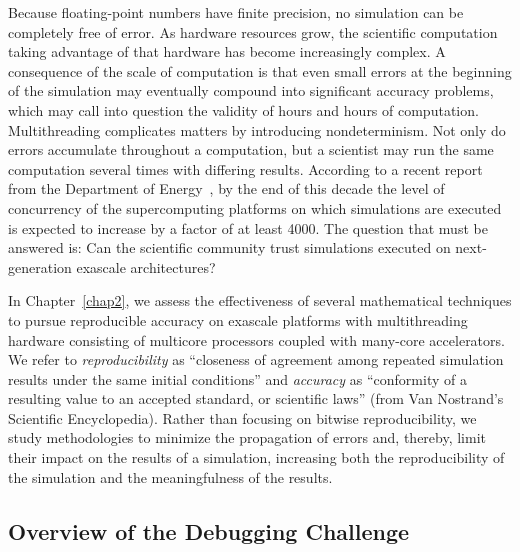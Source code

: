 Because floating-point numbers have finite precision, no simulation
can be completely free of error. As hardware resources grow, the
scientific computation taking advantage of that hardware has become
increasingly complex. A consequence of the scale of computation is
that even small errors at the beginning of the simulation may
eventually compound into significant accuracy problems, which may call
into question the validity of hours and hours of
computation. Multithreading complicates matters by introducing
nondeterminism. Not only do errors accumulate throughout a
computation, but a scientist may run the same computation several
times with differing results. According to a recent report from the
Department of Energy~\cite{Doe2014}, by the end of this decade the
level of concurrency of the supercomputing platforms on which
simulations are executed is expected to increase by a factor of at
least 4000.  The question that must be answered is: Can the scientific
community trust simulations executed on next-generation exascale
architectures?

In Chapter~\ref{chap2}, we assess the effectiveness of several mathematical
techniques to pursue reproducible accuracy on exascale platforms with
multithreading hardware consisting of multicore processors coupled
with many-core accelerators.  We refer to \textit{reproducibility} as
``closeness of agreement among repeated simulation results under the
same initial conditions'' and \textit{accuracy} as ``conformity of a
resulting value to an accepted standard, or scientific laws'' (from
Van Nostrand’s Scientific Encyclopedia). Rather than focusing on
bitwise reproducibility, we study methodologies to minimize the
propagation of errors and, thereby, limit their impact on the results
of a simulation, increasing both the reproducibility of the simulation
and the meaningfulness of the results. 

\subsection{Overview of the Debugging Challenge}

